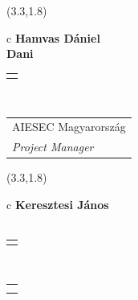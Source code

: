 \documentclass[11pt]{article}
\begin{document}
\makebox(3.3,1.8){
  \renewcommand\arraystretch{1.3}
  \begin{tabular}[c]{c}
    \hspace{8.5mm}
    \LARGE\bf{ Hamvas Dániel }\\
    \hspace{8.5mm}
    \Large{ Dani }\\
    \renewcommand\arraystretch{3}
    \begin{tabular}[c]{c}
      \centering
      \fontfamily{phv}\selectfont{
        \textbf{
          \textsc{
            \scriptsize{
            \color{Dark}{ Ismerkedő }\color{Bright}{ Webmester }\color{Bright}{ Sminkmester }\color{Bright}{ Programozó }
            }
          }
        }
      }
    \end{tabular}
    \\
    \renewcommand\arraystretch{1}
    \begin{tabular}{p{3.3in}}
      \hspace{.7cm}AIESEC Magyarország\\
      \hspace{.7cm}\emph{ Project Manager }\\
    \end{tabular}
  \end{tabular}
}

\makebox(3.3,1.8){
  \renewcommand\arraystretch{1.3}
  \begin{tabular}[c]{c}
    \hspace{8.5mm}
    \LARGE\bf{ Keresztesi János }\\
    \hspace{8.5mm}
    \Large{  }\\
    \renewcommand\arraystretch{3}
    \begin{tabular}[c]{c}
      \centering
      \fontfamily{phv}\selectfont{
        \textbf{
          \textsc{
            \scriptsize{
            \color{Dark}{ Ismerkedő }\color{Bright}{ Webmester }\color{Bright}{ Sminkmester }\color{Bright}{ Programozó }
            }
          }
        }
      }
    \end{tabular}
    \\
    \renewcommand\arraystretch{1}
    \begin{tabular}{p{3.3in}}
      \hspace{.7cm}\\
      \hspace{.7cm}\emph{  }\\
    \end{tabular}
  \end{tabular}
}
\end{document}
